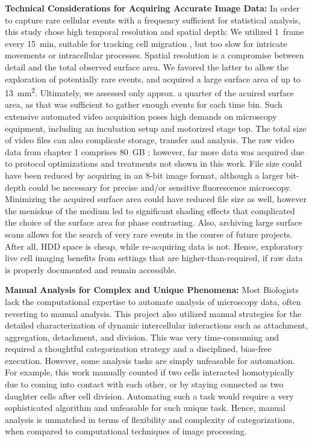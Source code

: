 \textbf{Technical Considerations for Acquiring Accurate Image Data:}
In order to capture rare cellular events with a frequency sufficient for
statistical analysis, this study chose high temporal resolution and spatial
depth: We utilized \SI{1}{frame} every \SI{15}{\minute}, suitable for tracking
cell migration \cite{huthSignificantlyImprovedPrecision2010}, but too slow for
intricate movements or intracellular processes. Spatial resolution is a
compromise between detail and the total observed surface area. We favored the
latter to allow the exploration of potentially rare events, and acquired a
 large surface area of up to
\SI{13}{\milli\meter\squared}. Ultimately, we assessed only approx. a quarter of
the acuired surface area, as that was sufficient to gather enough events for
each time bin. Such extensive automated video acquisition poses high demands on
microscopy equipment, including an incubation setup and motorized stage top. The
total size of video files can also complicate storage, transfer and analysis.
The raw video data from chapter 1 comprises \SI{80}{GB}
\cite{biostudiesBioStudiesEuropeanBioinformatics}; however, far more data was
acquired due to protocol optimizations and treatments not shown in this work.
File size could have been reduced by acquiring in an 8-bit image format,
although a larger bit-depth could be necessary for precise and/or sensitive
fluorescence microscopy. Minimizing the acquired surface area could have reduced
file size as well, however the meniskus of the medium led to significant shading
effects that complicated the choice of the surface area for phase contrasting.
Also, archiving large surface scans allows for the search of very rare events in
the course of future projects. After all, HDD space is cheap, while re-acquiring
data is not. Hence, exploratory live cell imaging benefits from settings that
are higher-than-required, if raw data is properly documented and remain
accessible.

\textbf{Manual Analysis for Complex and Unique Phenomena:}
Most Biologists lack the computational expertise to automate analysis of
microscopy data, often reverting to manual analysis. This project also utilized
manual strategies for the detailed characterization of dynamic intercellular
interactions such as attachment, aggregation, detachment, and division. This was
very time-consuming and required a thoughtful categorization strategy and a
disciplined, bias-free execution. However, some analysis tasks are simply unfeasable
for automation. For example, this work
manually counted if two \INA cells interacted homotypically due to coming into
contact with each other, or by staying connected as two daughter cells after
cell division. Automating such a task would require a very sophisticated
algorithm and unfeasable for such unique task.
Hence, manual analysis is unmatched in terms of flexibility and complexity of
categorizations, when compared to computational techniques of image processing.

